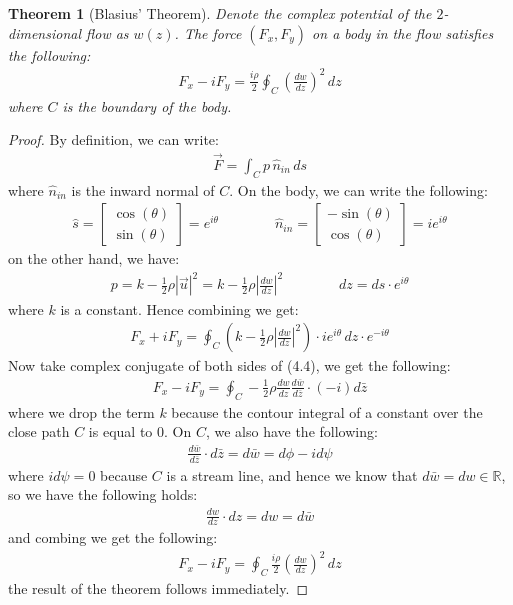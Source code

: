 \documentclass[11pt]{book}
\theoremstyle{break}
\theoremstyle{break}
\newtheorem{thm}{Theorem}[section]
\newcommand{\R}{\mathbb{R}}
\newcommand{\bmat}[1]{\begin{bmatrix} #1 \end{bmatrix}}
\begin{document}
\begin{thm}[Blasius' Theorem]
Denote the complex potential of the $2$-dimensional flow as $w(z)$. The force $(F_x,F_y)$ on a body in the flow satisfies the following:
\begin{align*}
F_x - iF_y  = \frac{i\rho}{2}\oint_C \left( \frac{dw}{dz}\right)^2 \, dz
\end{align*} 
where $C$ is the boundary of the body.
\end{thm}
\begin{proof}
By definition, we can write:
\begin{align*}
\vec{F} = \int_C p\, \hat{n}_{in}\, ds
\end{align*}
where $\hat{n}_{in}$ is the inward normal of $C$. On the body, we can write the following:
\begin{align*}
\hat{s} = \bmat{\cos(\theta) \\ \sin(\theta)} = e^{i\theta} \qquad\qquad \hat{n}_{in} = \bmat{-\sin(\theta) \\ \cos(\theta)} = ie^{i\theta}
\end{align*}
on the other hand, we have:
\begin{align*}
p = k - \frac{1}{2}\rho |\vec{u}|^2 = k-\frac{1}{2}\rho \left|\frac{dw}{dz}\right|^2 \qquad\qquad dz = ds\cdot e^{i\theta}
\end{align*}
where $k$ is a constant. Hence combining we get:
\begin{align}
F_x + iF_y = \oint_C\left( k - \frac{1}{2}\rho \left|\frac{dw}{dz}\right|^2\right)\cdot ie^{i\theta} \, dz \cdot e^{-i\theta}
\end{align}
Now take complex conjugate of both sides of (4.4), we get the following:
\begin{align*}
F_x - iF_y = \oint_C - \frac{1}{2}\rho \frac{dw}{dz}\frac{d\bar{w}}{d\bar{z}} \cdot (-i) d\bar{z}
\end{align*}
where we drop the term $k$ because the contour integral of a constant over the close path $C$ is equal to $0$. On $C$, we also have the following:
\begin{align*}
\frac{d\bar{w}}{d\bar{z}}\cdot d\bar{z} = d\bar{w} = d\phi - i d\psi
\end{align*}
where $id\psi = 0$ because $C$ is a stream line, and hence we know that $d\bar{w} = dw \in \R$, so we have the following holds:
\begin{align*}
\frac{dw}{dz} \cdot dz = dw = d\bar{w}
\end{align*}
and combing we get the following:
\begin{align*}
F_x - iF_y = \oint_C \frac{i\rho}{2}\left( \frac{dw}{dz}\right)^2 \, dz
\end{align*}
the result of the theorem follows immediately.
\end{proof}
\end{document}
